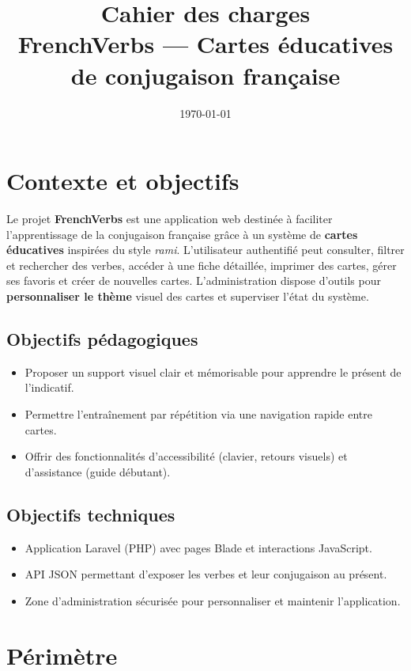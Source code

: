 \documentclass[12pt,a4paper]{article}
\title{Cahier des charges \\ \large FrenchVerbs --- Cartes éducatives de conjugaison française}
\author{}
\date{\today}
\begin{document}
\maketitle
\tableofcontents
\newpage

\section{Contexte et objectifs}
Le projet \textbf{FrenchVerbs} est une application web destinée à faciliter l'apprentissage de la conjugaison française grâce à un système de \textbf{cartes éducatives} inspirées du style \emph{rami}. L'utilisateur authentifié peut consulter, filtrer et rechercher des verbes, accéder à une fiche détaillée, imprimer des cartes, gérer ses favoris et créer de nouvelles cartes. L'administration dispose d'outils pour \textbf{personnaliser le thème} visuel des cartes et superviser l'état du système.

\subsection{Objectifs pédagogiques}
\begin{itemize}[leftmargin=*]
  \item Proposer un support visuel clair et mémorisable pour apprendre le présent de l'indicatif.
  \item Permettre l'entraînement par répétition via une navigation rapide entre cartes.
  \item Offrir des fonctionnalités d'accessibilité (clavier, retours visuels) et d'assistance (guide débutant).
\end{itemize}

\subsection{Objectifs techniques}
\begin{itemize}[leftmargin=*]
  \item Application Laravel (PHP) avec pages Blade et interactions JavaScript.
  \item API JSON permettant d'exposer les verbes et leur conjugaison au présent.
  \item Zone d'administration sécurisée pour personnaliser et maintenir l'application.
\end{itemize}

\section{Périmètre}
\end{document}
